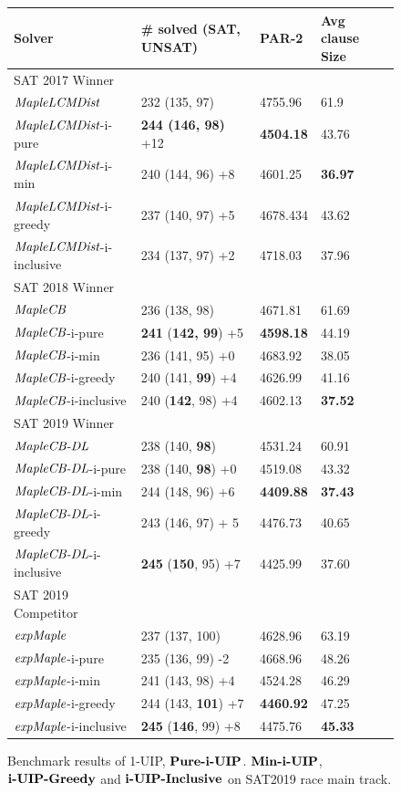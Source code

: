 \begin{figure} 
\begin{center}
\begin{tabular}{ | m{3.7cm} | m{4cm}| m{2cm} | m{2.75cm} |  } 
\hline
Solver & \# solved (SAT, UNSAT) & PAR-2 & Avg clause Size \\ 
\hline
SAT 2017 Winner & & & \\
$\textit{MapleLCMDist}$ & 232 (135, 97) & 4755.96 & 61.9  \\ 
\hline
$\textit{MapleLCMDist}$-i-pure & \textbf{244 (146, 98)} +12 & \textbf{4504.18} & 43.76 \\
\hline
$\textit{MapleLCMDist}$-i-min & 240 (144, 96) +8 & 4601.25 & \textbf{36.97} \\ 
\hline
$\textit{MapleLCMDist}$-i-greedy & 237 (140, 97) +5 & 4678.434 & 43.62 \\ 
\hline
$\textit{MapleLCMDist}$-i-inclusive & 234 (137, 97) +2 & 4718.03 & 37.96 \\
\hline
\hline
SAT 2018 Winner & & & \\
$\textit{MapleCB}$ & 236 (138, 98) & 4671.81 & 61.69 \\
\hline
$\textit{MapleCB}$-i-pure & \textbf{241} (\textbf{142, 99}) +5 & \textbf{4598.18} & 44.19 \\
\hline
$\textit{MapleCB}$-i-min & 236 (141, 95) +0 & 4683.92 & 38.05 \\ 
\hline
$\textit{MapleCB}$-i-greedy & 240 (141, \textbf{99}) +4 & 4626.99 & 41.16 \\
\hline
$\textit{MapleCB}$-i-inclusive & 240 (\textbf{142}, 98) +4 & 4602.13 & \textbf{37.52} \\
\hline
\hline
SAT 2019 Winner & & & \\
$\textit{MapleCB-DL}$ & 238 (140, \textbf{98}) & 4531.24 & 60.91 \\
\hline
$\textit{MapleCB-DL}$-i-pure & 238 (140, \textbf{98}) +0 & 4519.08 &  43.32\\
\hline
$\textit{MapleCB-DL}$-i-min & 244 (148, 96) +6 & \textbf{4409.88} & \textbf{37.43} \\
\hline
$\textit{MapleCB-DL}$-i-greedy & 243 (146, 97) + 5 & 4476.73 & 40.65 \\
\hline
$\textit{MapleCB-DL}$-i-inclusive & \textbf{245} (\textbf{150}, 95) +7 & 4425.99 & 37.60 \\
\hline
\hline
SAT 2019 Competitor & & &\\
$\textit{expMaple}$ & 237 (137, 100)  & 4628.96 & 63.19 \\
\hline
$\textit{expMaple}$-i-pure & 235 (136, 99) -2  & 4668.96 & 48.26 \\
\hline
$\textit{expMaple}$-i-min & 241 (143, 98) +4 & 4524.28 & 46.29 \\ 
\hline
$\textit{expMaple}$-i-greedy & 244 (143, \textbf{101}) +7 & \textbf{4460.92} & 47.25 \\
\hline
$\textit{expMaple}$-i-inclusive & \textbf{245} (\textbf{146}, 99) +8 & 4475.76 & \textbf{45.33} \\
\hline
\end{tabular}
\end{center}
\caption{Benchmark results of 1-UIP, $\textbf{Pure-i-UIP}$. $\textbf{Min-i-UIP}$, $\textbf{i-UIP-Greedy}$ and $\textbf{i-UIP-Inclusive}$ on SAT2019 race main track.}
\label{fig:t5}
\end{figure}

